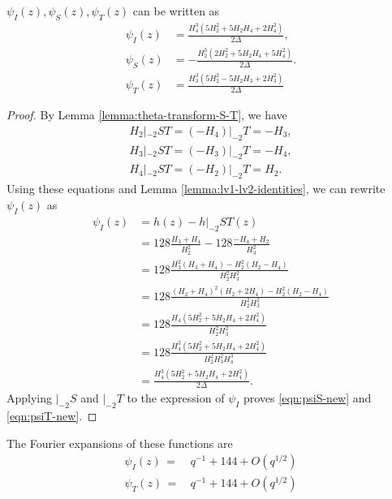 \begin{lemma}\label{lemma:psi-new}
    $\psi_I(z), \psi_S(z), \psi_T(z)$ can be written as
    \begin{align}
        \psi_I(z) &= \frac{H_4^3 (5 H_2^2 + 5 H_2 H_4 + 2 H_4^2)}{2\Delta}, \label{eqn:psiI-new} \\
        \psi_S(z) &= -\frac{H_2^3 (2 H_2^2 + 5 H_2 H_4 + 5 H_4^2)}{2 \Delta}. \label{eqn:psiS-new} \\
        \psi_T(z) &= \frac{H_3^3 (5 H_2^2 - 5 H_2 H_3 + 2 H_3^2)}{2 \Delta}\label{eqn:psiT-new}
    \end{align}
\end{lemma}
\begin{proof}
By Lemma \ref{lemma:theta-transform-S-T}, we have
\begin{align}
    H_2|_{-2}ST = (-H_4)|_{-2}T = -H_3, \\
    H_3|_{-2}ST = (-H_3)|_{-2}T = -H_4, \\
    H_4|_{-2}ST = (-H_2)|_{-2}T = H_2.
\end{align}
Using these equations and Lemma \ref{lemma:lv1-lv2-identities}, we can rewrite $\psi_I(z)$ as
\begin{align}
    \psi_I(z) &= h(z) - h|_{-2}ST(z) \\
    &= 128 \frac{H_3 + H_4}{H_2^2} - 128 \frac{-H_4 + H_2}{H_3^2} \\
    &= 128 \frac{H_3^2 (H_3 + H_4) - H_2^2 (H_2 - H_4)}{H_2^2 H_3^2} \\
    &= 128 \frac{(H_2 + H_4)^2 (H_2 + 2 H_4) - H_2^2 (H_2 - H_4)}{H_2^2 H_3^2} \\
    &= 128 \frac{H_4(5 H_2^2 + 5 H_2 H_4 + 2 H_4^2)}{ H_2^2 H_3^2} \\
    &= 128 \frac{H_4^3(5 H_2^2 + 5 H_2 H_4 + 2 H_4^2)}{ H_2^2 H_3^2 H_4^3} \\
    &= \frac{H_4^3 (5 H_2^2 + 5 H_2 H_4 + 2 H_4^2)}{2\Delta}.
\end{align}
Applying $|_{-2}S$ and $|_{-2}T$ to the expression of $\psi_I$ proves \eqref{eqn:psiS-new} and \eqref{eqn:psiT-new}.
\end{proof}


\begin{lemma}\label{lemma:psiI-psiT-psiS-fourier}
The Fourier expansions of these functions are
\begin{align}
    \psi_I(z)\,=\,&q^{-1} + 144 + O(q^{1/2}) \label{eqn: psi fourier I}\\
    \psi_T(z)\,=\,&q^{-1} + 144 + O(q^{1/2}) \label{eqn: psi fourier T}
\end{align}
\end{lemma}

